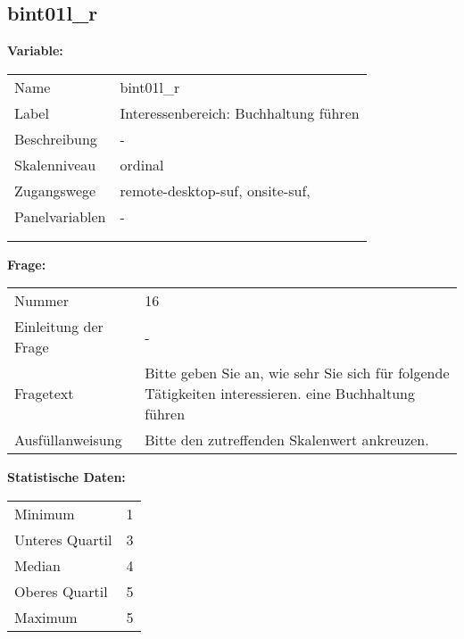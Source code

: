 	
	
	\subsection{bint01l\_r}
	\label{subSection:bint01l_r}

	\noindent\textbf{Variable:}\\
		\begin{tabular}{lL{11.3cm}}
			\label{tableVariable:bint01l_r}
			Name & bint01l\_r \\
			Label & Interessenbereich: Buchhaltung führen \\
			Beschreibung & - \\
			Skalenniveau & ordinal \\
			Zugangswege &
				remote-desktop-suf,
				onsite-suf,
 \\
			Panelvariablen & -
			 \\
			 \\
 \\
		\end{tabular}

		\vspace*{1 cm}
		\noindent\textbf{Frage:}\\
		\begin{tabular}{lL{11.3cm}}
			\label{tableQuestion:bint01l_r}
			Nummer & 16 \\
			Einleitung der Frage & - \\
			Fragetext & Bitte geben Sie an, wie sehr Sie sich für folgende Tätigkeiten interessieren.
eine Buchhaltung führen \\
			Ausfüllanweisung & Bitte den zutreffenden Skalenwert ankreuzen. \\
		\end{tabular}


		\vspace*{1 cm}
		\noindent\textbf{Statistische Daten:}\\
			\begin{tabular}{ll}
				\label{tableStatistics:bint01l_r}
					Minimum & 1 \\
					Unteres Quartil & 3 \\
					Median & 4 \\
					Oberes Quartil & 5 \\
					Maximum & 5 \\
			\end{tabular}



